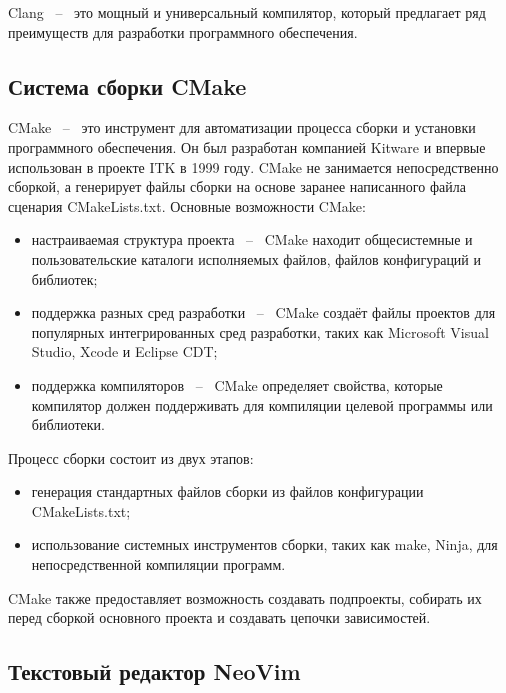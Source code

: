 Clang ~--~ это мощный и универсальный компилятор, который предлагает ряд преимуществ для разработки программного обеспечения.

\subsection{Система сборки CMake}
CMake ~--~ это инструмент для автоматизации процесса сборки и установки программного обеспечения. Он был разработан компанией Kitware и впервые использован в проекте ITK в 1999 году. CMake не занимается непосредственно сборкой, а генерирует файлы сборки на основе заранее написанного файла сценария CMakeLists.txt.
Основные возможности CMake:
\begin{itemize}
\item настраиваемая структура проекта ~--~ CMake находит общесистемные и пользовательские каталоги исполняемых файлов, файлов конфигураций и библиотек;
\item поддержка разных сред разработки ~--~ CMake создаёт файлы проектов для популярных интегрированных сред разработки, таких как Microsoft Visual Studio, Xcode и Eclipse CDT;
\item поддержка компиляторов ~--~ CMake определяет свойства, которые компилятор должен поддерживать для компиляции целевой программы или библиотеки.
\end{itemize}

Процесс сборки состоит из двух этапов:
\begin{itemize}
\item генерация стандартных файлов сборки из файлов конфигурации CMakeLists.txt;
\item использование системных инструментов сборки, таких как make, Ninja, для непосредственной компиляции программ.
\end{itemize}

CMake также предоставляет возможность создавать подпроекты, собирать их перед сборкой основного проекта и создавать цепочки зависимостей.

\subsection{Текстовый редактор NeoVim}

